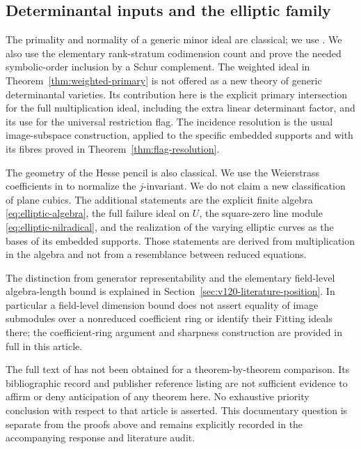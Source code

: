 \subsection{Determinantal inputs and the elliptic family}
\label{sec:v121-literature}
The primality and normality of a generic minor ideal are classical;
we use \cite[Theorem 3.5(c)]{BRW05}. We also use the elementary
rank-stratum codimension count and prove the needed symbolic-order
inclusion by a Schur complement. The weighted ideal in
Theorem~\ref{thm:weighted-primary} is not offered as a new theory
of generic determinantal varieties. Its contribution here is the
explicit primary intersection for the full multiplication ideal,
including the extra linear determinant factor, and its use for
the universal restriction flag. The incidence resolution is the
usual image-subspace construction, applied to the specific embedded
supports and with its fibres proved in
Theorem~\ref{thm:flag-resolution}.

The geometry of the Hesse pencil is also classical. We use the
Weierstrass coefficients in \cite[Section 2]{AD09} to normalize
the $j$-invariant. We do not claim a new classification of plane
cubics. The additional statements are the explicit finite algebra
\eqref{eq:elliptic-algebra}, the full failure ideal on $U$, the
square-zero line module \eqref{eq:elliptic-nilradical}, and the
realization of the varying elliptic curves as the bases of its
embedded supports. Those statements are derived from multiplication
in the algebra and not from a resemblance between reduced equations.

The distinction from generator representability and the elementary
field-level algebra-length bound is explained in
Section~\ref{sec:v120-literature-position}. In particular a
field-level dimension bound does not assert equality of image
submodules over a nonreduced coefficient ring or identify their
Fitting ideals there; the coefficient-ring argument and sharpness
construction are provided in full in this article.

The full text of \cite{Ballico93} has not been obtained for a
theorem-by-theorem comparison. Its bibliographic record and publisher
reference listing are not sufficient evidence to affirm or deny
anticipation of any theorem here. No exhaustive priority conclusion
with respect to that article is asserted. This documentary question
is separate from the proofs above and remains explicitly recorded
in the accompanying response and literature audit.
